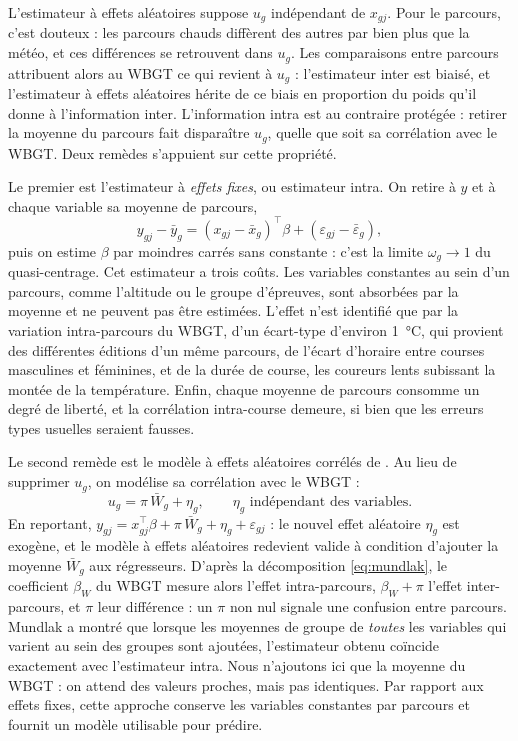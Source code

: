 \documentclass[11pt,a4paper]{article}
\begin{document}
L'estimateur à effets aléatoires suppose $u_g$ indépendant de $x_{gj}$. Pour le parcours, c'est douteux : les parcours
chauds diffèrent des autres par bien plus que la météo, et ces différences se retrouvent dans $u_g$. Les comparaisons
entre parcours attribuent alors au WBGT ce qui revient à $u_g$ : l'estimateur inter est biaisé, et l'estimateur à
effets aléatoires hérite de ce biais en proportion du poids qu'il donne à l'information inter. L'information intra est
au contraire protégée : retirer la moyenne du parcours fait disparaître $u_g$, quelle que soit sa corrélation avec le
WBGT. Deux remèdes s'appuient sur cette propriété.

Le premier est l'estimateur à \emph{effets fixes}, ou estimateur intra. On retire à $y$ et à chaque variable sa
moyenne de parcours,
\[
y_{gj} - \bar y_g = (x_{gj} - \bar x_g)^\top\beta + (\varepsilon_{gj} - \bar\varepsilon_g),
\]
puis on estime $\beta$ par moindres carrés sans constante : c'est la limite $\omega_g \to 1$ du quasi-centrage. Cet
estimateur a trois coûts. Les variables constantes au sein d'un parcours, comme l'altitude ou le groupe d'épreuves,
sont absorbées par la moyenne et ne peuvent pas être estimées. L'effet n'est identifié que par la variation
intra-parcours du WBGT, d'un écart-type d'environ 1~°C, qui provient des différentes éditions d'un même parcours, de
l'écart d'horaire entre courses masculines et féminines, et de la durée de course, les coureurs lents subissant la
montée de la température. Enfin, chaque moyenne de parcours consomme un degré de liberté, et la corrélation
intra-course demeure, si bien que les erreurs types usuelles seraient fausses.

Le second remède est le modèle à effets aléatoires corrélés de \citet{mundlak1978}. Au lieu de supprimer $u_g$, on
modélise sa corrélation avec le WBGT :
\[
u_g = \pi\,\bar W_g + \eta_g, \qquad \eta_g \text{ indépendant des variables.}
\]
En reportant, $y_{gj} = x_{gj}^\top\beta + \pi\,\bar W_g + \eta_g + \varepsilon_{gj}$ : le nouvel effet aléatoire
$\eta_g$ est exogène, et le modèle à effets aléatoires redevient valide à condition d'ajouter la moyenne $\bar W_g$
aux régresseurs. D'après la décomposition \eqref{eq:mundlak}, le coefficient $\beta_W$ du WBGT mesure alors l'effet
intra-parcours, $\beta_W + \pi$ l'effet inter-parcours, et $\pi$ leur différence : un $\pi$ non nul signale une
confusion entre parcours. Mundlak a montré que lorsque les moyennes de groupe de \emph{toutes} les variables qui
varient au sein des groupes sont ajoutées, l'estimateur obtenu coïncide exactement avec l'estimateur intra. Nous
n'ajoutons ici que la moyenne du WBGT : on attend des valeurs proches, mais pas identiques. Par rapport aux effets
fixes, cette approche conserve les variables constantes par parcours et fournit un modèle utilisable pour prédire.
\end{document}
